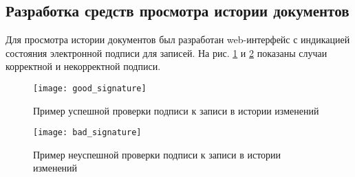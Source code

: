 \subsection{Разработка средств просмотра истории документов} \label{git_history}

Для просмотра истории документов был разработан web-интерфейс с индикацией состояния электронной подписи для записей. На рис. \ref{img:good_signature} и \ref{img:bad_signature} показаны случаи корректной и некорректной подписи.

\begin{figure}[h!]
	\centering
	\texttt{[image: good\_signature]}
	\caption{Пример успешной проверки подписи к записи в истории изменений}
	\label{img:good_signature}
\end{figure}

\begin{figure}[h!]
	\centering
	\texttt{[image: bad\_signature]}
	\caption{Пример неуспешной проверки подписи к записи в истории изменений}
	\label{img:bad_signature}
\end{figure}
\FloatBarrier